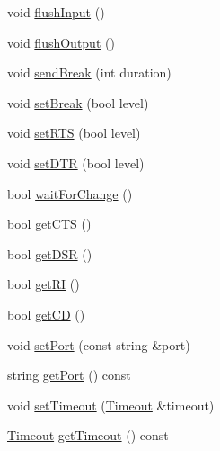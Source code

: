 \begin{DoxyCompactItemize}
\item 
void \mbox{\hyperlink{classserial_1_1serial_1_1_serial_1_1_serial_impl_a0b4ef99a4b44c3ef153ec7c4802ff194}{flush\+Input}} ()
\item 
void \mbox{\hyperlink{classserial_1_1serial_1_1_serial_1_1_serial_impl_ac61932385ea2ce645192e1539349500b}{flush\+Output}} ()
\item 
void \mbox{\hyperlink{classserial_1_1serial_1_1_serial_1_1_serial_impl_a6a1abcf6f4b94c7f3d7753c3f2dab91a}{send\+Break}} (int duration)
\item 
void \mbox{\hyperlink{classserial_1_1serial_1_1_serial_1_1_serial_impl_a4e439ed9ab4e38fb64bba2d49b814179}{set\+Break}} (bool level)
\item 
void \mbox{\hyperlink{classserial_1_1serial_1_1_serial_1_1_serial_impl_a7faf4ef9a0f1b13c9155a4cae1e0ace9}{set\+R\+TS}} (bool level)
\item 
void \mbox{\hyperlink{classserial_1_1serial_1_1_serial_1_1_serial_impl_a94cdd2aad19377a0ec435bb6241b98a8}{set\+D\+TR}} (bool level)
\item 
bool \mbox{\hyperlink{classserial_1_1serial_1_1_serial_1_1_serial_impl_a09f1dcb8e32cb64188daaf8ac0d40215}{wait\+For\+Change}} ()
\item 
bool \mbox{\hyperlink{classserial_1_1serial_1_1_serial_1_1_serial_impl_afbfd566cd435f7881826fb0a2f74f746}{get\+C\+TS}} ()
\item 
bool \mbox{\hyperlink{classserial_1_1serial_1_1_serial_1_1_serial_impl_ae07e012e3630c51baf1b8c7c37dd79a5}{get\+D\+SR}} ()
\item 
bool \mbox{\hyperlink{classserial_1_1serial_1_1_serial_1_1_serial_impl_a4b9e1b75dce29e8ed4fa62b389510ae5}{get\+RI}} ()
\item 
bool \mbox{\hyperlink{classserial_1_1serial_1_1_serial_1_1_serial_impl_a9d402e28513e22613658b31e13b76802}{get\+CD}} ()
\item 
void \mbox{\hyperlink{classserial_1_1serial_1_1_serial_1_1_serial_impl_aa3b4c490f3246a506dd29135553ecd64}{set\+Port}} (const string \&port)
\item 
string \mbox{\hyperlink{classserial_1_1serial_1_1_serial_1_1_serial_impl_aae10cc0beaa3fc5b9d88c53c976edf1a}{get\+Port}} () const
\item 
void \mbox{\hyperlink{classserial_1_1serial_1_1_serial_1_1_serial_impl_a22cc09f7e828c54631392dc69e3737d3}{set\+Timeout}} (\mbox{\hyperlink{structserial_1_1_timeout}{Timeout}} \&timeout)
\item 
\mbox{\hyperlink{structserial_1_1_timeout}{Timeout}} \mbox{\hyperlink{classserial_1_1serial_1_1_serial_1_1_serial_impl_ac83d791d7720e05499c2dbe6cb3f4ae2}{get\+Timeout}} () const

\end{DoxyCompactItemize}
